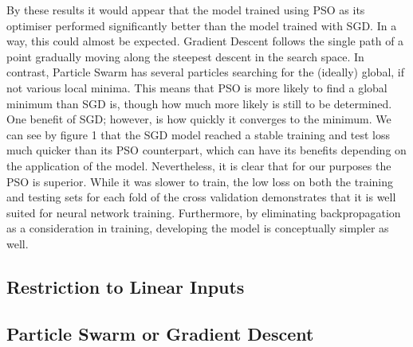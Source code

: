 \documentclass[12pt]{article}
\begin{document}
By these results it would appear that the model trained using PSO as its optimiser performed significantly better than the model trained with SGD. 
In a way, this could almost be expected. Gradient Descent follows the single path of a point gradually moving along the steepest descent in the search space.
In contrast, Particle Swarm has several particles searching for the (ideally) global, if not various local minima. 
This means that PSO is more likely to find a global minimum than SGD is, though how much more likely is still to be determined.
One benefit of SGD; however, is how quickly it converges to the minimum. 
We can see by figure 1 that the SGD model reached a stable training and test loss much quicker than its PSO counterpart, which can have its benefits depending on the application of the model.
Nevertheless, it is clear that for our purposes the PSO is superior. 
While it was slower to train, the low loss on both the training and testing sets for each fold of the cross validation demonstrates that it is well suited for neural network training. Furthermore, by eliminating backpropagation as a consideration in training, developing the model is conceptually simpler as well. 
\subsection{Restriction to Linear Inputs}
\subsection{Particle Swarm or Gradient Descent}
\end{document}
